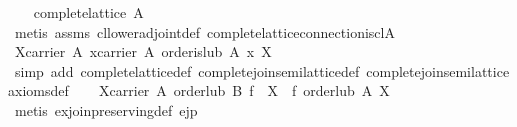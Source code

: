 \begin{isabellebody}
\ \ \isamarkupfalse%
\ {}complete{}lattice\ A{}\isanewline
\ \ \ \ \isamarkupfalse%
\ {}metis\ assms\ cl{}lower{}adjoint{}def\ complete{}lattice{}connection{}is{}cl{}A{}\isanewline
\ \ \isamarkupfalse%
\ {}{}X{}carrier\ A{}\ {}x{}carrier\ A{}\ order{}is{}lub\ A\ x\ X{}\isanewline
\ \ \ \ \isamarkupfalse%
\ {}simp\ add{}\ complete{}lattice{}def\ complete{}join{}semilattice{}def\ complete{}join{}semilattice{}axioms{}def{}\isanewline
\ \ \isamarkupfalse%
\ {}{}X{}carrier\ A{}\ order{}lub\ B\ {}f\ {}\ X{}\ {}\ f\ {}order{}lub\ A\ X{}{}\isanewline
\ \ \ \ \isamarkupfalse%
\ {}metis\ ex{}join{}preserving{}def\ ejp{}\isanewline

\end{isabellebody}
